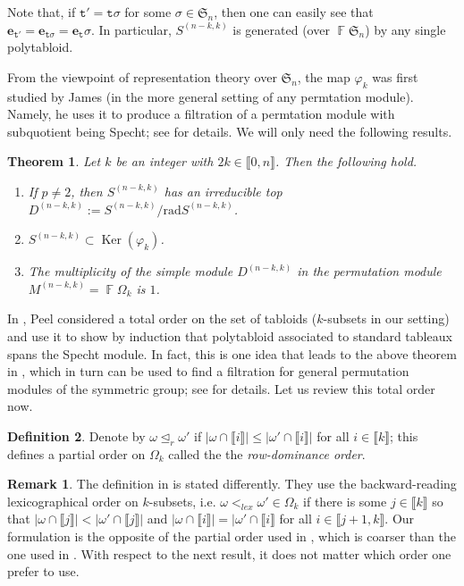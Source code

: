 \documentclass[a4paper]{amsart}
\numberwithin{equation}{subsection}
\newtheorem{theorem}{Theorem}[section]
\theoremstyle{definition}
\newtheorem{remark}{Remark}
\newtheorem{definition}[theorem]{Definition}
\DeclareMathOperator{\F}{\mathbb{F}}
\newcommand{\interval}[1]{\llbracket #1 \rrbracket}
\DeclareMathOperator{\Ker}{\mathrm{Ker}}
\newcommand{\bfe}{\pmb{e}}
\newcommand{\tbx}{\mathtt{t}}
\newcommand{\ulhd}{\trianglelefteq}
\numberwithin{equation}{subsection}
\begin{document}
Note that, if $\tbx'=\tbx \sigma$ for some $\sigma\in\mathfrak{S}_n$, then one can easily see that $\bfe_{\tbx'} = \bfe_{\tbx\sigma} = \bfe_{\tbx}\sigma$.
In particular, $S^{(n-k,k)}$ is generated (over $\F\mathfrak{S}_n$) by any single polytabloid.

From the viewpoint of representation theory over $\mathfrak{S}_n$, the map $\varphi_k$ was first studied by James (in the more general setting of any permtation module).  Namely, he uses it to produce a filtration of a permtation module with subquotient being Specht; see \cite{James3} for details.  We will only need the following results.

\begin{theorem}\label{thm:James}
Let $k$ be an integer with $2k\in\interval{0,n}$.  Then the following hold.
\begin{enumerate}
\item {\rm\cite{James1}} If $p\neq 2$, then $S^{(n-k,k)}$ has an irreducible top $D^{(n-k,k)}:=S^{(n-k,k)}/\mathrm{rad}S^{(n-k,k)}$.

\item {\rm\cite[Theorem 9.1]{James2}} $S^{(n-k,k)}\subset \Ker(\varphi_k)$.

\item {\rm \cite[Theorem 12.1]{James3}} The multiplicity of the simple module $D^{(n-k,k)}$ in the permutation module $M^{(n-k,k)}=\F\Omega_k$ is $1$.
\end{enumerate}
\end{theorem}

In \cite{Pe}, Peel considered a total order on the set of tabloids ($k$-subsets in our setting) and use it to show by induction that polytabloid associated to standard tableaux spans the Specht module.  In fact, this is one idea that leads to the above theorem in \cite{James2}, which in turn can be used to find a filtration for general permutation modules of the symmetric group; see \cite{James2, James3} for details.  Let us review this total order now.

\begin{definition}\label{def:Sa-order}
Denote by $\omega\ulhd_r\omega'$ if $|\omega\cap \interval{i}| \leq |\omega'\cap \interval{i}|$ for all $i\in\interval{k}$; this defines a partial order on $\Omega_k$ called the the \emph{row-dominance order}.
\end{definition}
\begin{remark}\label{rmk:orders}
The definition in \cite{James2} is stated differently. They use the backward-reading lexicographical order on $k$-subsets, i.e. $\omega <_{lex} \omega' \in \Omega_k$ if there is some $j\in \interval{k}$ so that $|\omega\cap\interval{j}|<|\omega'\cap\interval{j}|$ and $|\omega\cap\interval{i}|=|\omega'\cap \interval{i}$ for all $i\in\interval{j+1,k}$.
Our formulation is the opposite of the partial order used in \cite{Sag}, which is coarser than the one used in \cite{James2}.
With respect to the next result, it does not matter which order one prefer to use.
\end{remark}
\end{document}
